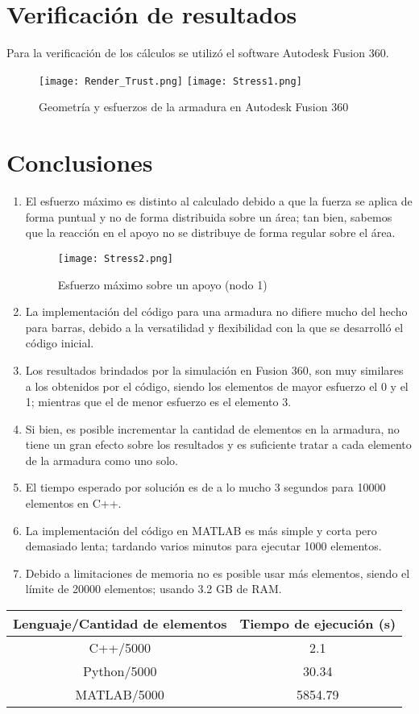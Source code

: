 \documentclass[12pt,a4paper]{article}
\begin{document}
\section{Verificación de resultados}
Para la verificación de los cálculos se utilizó el software Autodesk Fusion 360.
\begin{figure}[H]
    \centering
    \texttt{[image: Render\_Trust.png]}
    \texttt{[image: Stress1.png]}
    \caption{Geometría y esfuerzos de la armadura en Autodesk Fusion 360}
\end{figure}
\section{Conclusiones}
\begin{enumerate}
\item El esfuerzo máximo es distinto al calculado debido a que la fuerza se aplica de forma puntual y no de forma distribuida sobre un área; tan bien, sabemos que la reacción en el apoyo no se distribuye de forma regular sobre el área.
\begin{figure}[H]
    \centering
    \texttt{[image: Stress2.png]}
    \caption{Esfuerzo máximo sobre un apoyo (nodo 1)}
\end{figure}
\item La implementación del código para una armadura no difiere mucho del hecho para barras, debido a la versatilidad y flexibilidad con la que se desarrolló el código inicial.
\item Los resultados brindados por la simulación en Fusion 360, son muy similares a los obtenidos por el código, siendo los elementos de mayor esfuerzo el 0 y el 1; mientras que el de menor esfuerzo es el elemento 3.
\item Si bien, es posible incrementar la cantidad de elementos en la armadura, no tiene un gran efecto sobre los resultados y es suficiente tratar a cada elemento de la armadura como uno solo.
\item El tiempo esperado por solución es de a lo mucho 3 segundos para 10000 elementos en C++.
\item La implementación del código en MATLAB es más simple y corta pero demasiado lenta; tardando varios minutos para ejecutar 1000 elementos.
\item Debido a limitaciones de memoria no es posible usar más elementos, siendo el límite de 20000 elementos; usando 3.2 GB de RAM.
\end{enumerate}
\begin{center}
\begin{tabular}{|c|c|}
\hline 
Lenguaje/Cantidad de elementos & Tiempo de ejecución (s) \\ 
\hline 
C++/5000 & 2.1 \\ 
\hline 
Python/5000 & 30.34 \\ 
\hline 
MATLAB/5000 & 5854.79 \\ 
\hline 
\end{tabular}
\end{center}
\end{document}
